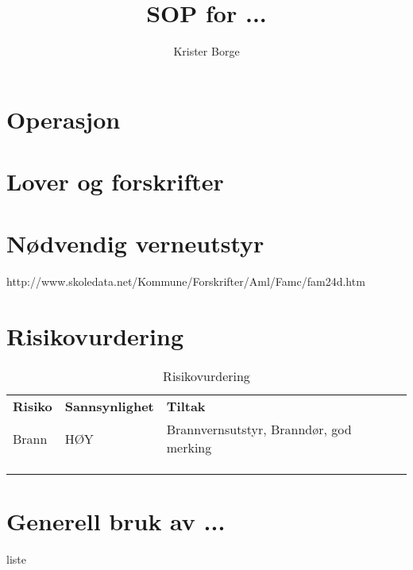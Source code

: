 \documentclass[11pt,a4paper]{article}
\author{Krister Borge}
\title{SOP  for ...}
\begin{document}
\maketitle


\section*{Operasjon}


\section*{Lover og forskrifter}


\section*{Nødvendig verneutstyr}

http://www.skoledata.net/Kommune/Forskrifter/Aml/Famc/fam24d.htm


\section*{Risikovurdering}

\begin{table}[H]
\centering
\caption{Risikovurdering}
\label{Risikovurdering}
\begin{tabular}{@{}|l|l|l|@{}}
\rowcolor[HTML]{656565}
\textbf{Risiko} & \textbf{Sannsynlighet} & \textbf{Tiltak}                         \\
Brann           & HØY                    & Brannvernsutstyr, Branndør, god merking \\
                &                        &                                         \\
                &                        &                                         \\
                &                        &                                         \\
\end{tabular}
\end{table}

\section*{Generell bruk av  ...}
liste
\end{document}
